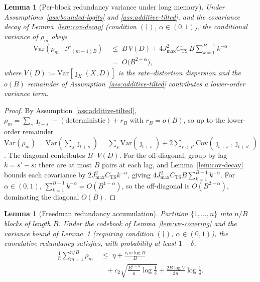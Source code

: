\documentclass[11pt]{article}
\newcommand{\F}{\mathcal{F}}
\theoremstyle{plain}
\newtheorem{lemma}[theorem]{Lemma}
\theoremstyle{definition}
\theoremstyle{remark}
\begin{document}
\begin{lemma}[Per-block redundancy variance under long memory]
\label{lem:block-variance}
Under Assumptions~\ref{ass:bounded-logits} and
\ref{ass:additive-tilted}, and the covariance decay of
Lemma~\ref{lem:cov-decay} (condition $(\dagger)$, $\alpha \in
(0,1)$), the conditional variance of $\rho_m$ obeys
\[
\begin{split}
\mathrm{Var}(\rho_m \mid \F_{(m-1)B})
&\;\leq\;
B\,V(D) + 4 J_{\max}^2 C_{\mathrm{TS}}\, B \sum_{k=1}^{B-1} k^{-\alpha}\\
&\;=\; O\!\bigl(B^{2-\alpha}\bigr),
\end{split}
\]
where $V(D) := \mathrm{Var}[\jmath_X(X,D)]$ is the rate--distortion
dispersion \citep{kostina2012fixed} and the $o(B)$ remainder of
Assumption~\ref{ass:additive-tilted} contributes a lower-order
variance term.
\end{lemma}

\begin{proof}
By Assumption~\ref{ass:additive-tilted}, $\rho_m = \sum_s \jmath_{t+s}
- (\text{deterministic}) + r_B$ with $r_B = o(B)$, so up to the
lower-order remainder
$\mathrm{Var}(\rho_m) = \mathrm{Var}(\sum_s \jmath_{t+s})
= \sum_s \mathrm{Var}(\jmath_{t+s})
+ 2\sum_{s<s'}\mathrm{Cov}(\jmath_{t+s},\jmath_{t+s'})$. The diagonal
contributes $B \cdot V(D)$. For the off-diagonal, group by lag
$k = s'-s$: there are at most $B$ pairs at each lag, and
Lemma~\ref{lem:cov-decay} bounds each covariance by
$2 J_{\max}^2 C_{\mathrm{TS}} k^{-\alpha}$, giving
$4 J_{\max}^2 C_{\mathrm{TS}} B \sum_{k=1}^{B-1} k^{-\alpha}$. For
$\alpha \in (0,1)$, $\sum_{k=1}^{B-1} k^{-\alpha} = O(B^{1-\alpha})$,
so the off-diagonal is $O(B^{2-\alpha})$, dominating the diagonal
$O(B)$.
\end{proof}

\begin{lemma}[Freedman redundancy accumulation]
\label{lem:redundancy-accum}
Partition $\{1, \ldots, n\}$ into $n/B$ blocks of length $B$. Under
the codebook of Lemma~\ref{lem:wr-covering} and the variance bound
of Lemma~\ref{lem:block-variance} (requiring condition $(\dagger)$,
$\alpha \in (0,1)$), the cumulative redundancy satisfies, with
probability at least $1-\delta$,
\[
\begin{split}
\frac{1}{n}\sum_{m=1}^{n/B} \rho_m
&\;\leq\;
\eta + \frac{c_1 w \log B}{B}\\
&\quad + c_2 \sqrt{\frac{B^{1-\alpha}}{n}\log\frac1\delta}
   + \frac{2 B \log V}{3n}\log\frac1\delta.
\end{split}
\]
\end{lemma}
\end{document}
